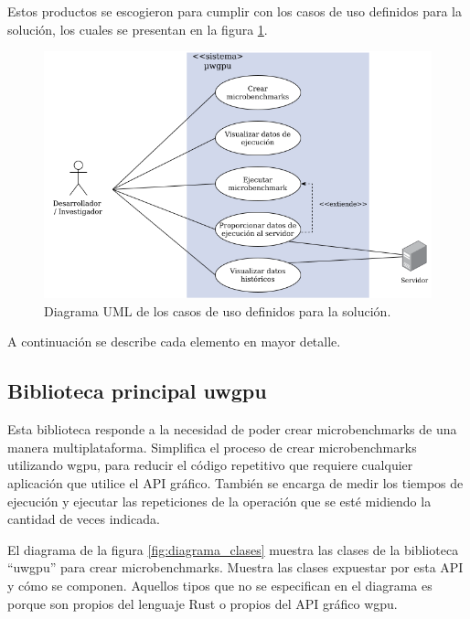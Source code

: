 \documentclass[conference]{IEEEtran}
\begin{document}
Estos productos se escogieron para cumplir con los casos de uso definidos para
la solución, los cuales se
presentan en la figura \ref{fig:casos_de_uso}.

\begin{figure}
  \includegraphics[width=\linewidth]{images/UML Casos de Uso.png}
  \caption{Diagrama UML de los casos de uso definidos para la solución.}
  \label{fig:casos_de_uso}
\end{figure}

A continuación se describe cada elemento en mayor detalle.

\subsection{Biblioteca principal uwgpu}

Esta biblioteca responde a la necesidad de poder crear microbenchmarks de una
manera multiplataforma. Simplifica el proceso de crear microbenchmarks
utilizando wgpu, para reducir el código repetitivo que requiere cualquier
aplicación que utilice el API gráfico. También se encarga de medir los tiempos
de ejecución y ejecutar las repeticiones de la operación que se esté midiendo
la cantidad de veces indicada.

El diagrama de la figura \ref{fig:diagrama_clases} muestra las clases de la biblioteca “uwgpu” para crear microbenchmarks.
Muestra las clases expuestar por esta API y cómo se componen.
Aquellos tipos que no se especifican en el diagrama es porque son propios del lenguaje Rust o propios del API gráfico wgpu.
\end{document}

